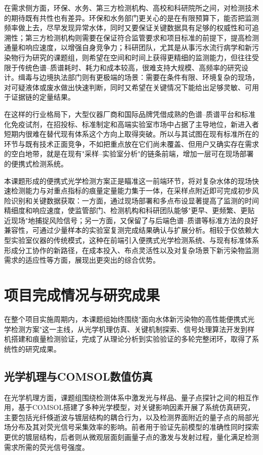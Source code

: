 \documentclass[12pt,a4paper]{article}
\begin{document}
在需求侧方面，环保、水务、第三方检测机构、高校和科研院所之间，对检测技术的期待既有共性也有差异。环保和水务部门更关心的是在有限预算下，能否把监测频率做上去，尽早发现异常水体，同时又要保证关键数据具有足够的权威性和可追溯性；第三方检测机构则需要在保证符合监管要求和项目标准的前提下，提高检测通量和响应速度，以增强自身竞争力；科研团队，尤其是从事污水流行病学和新污染物行为研究的课题组，则希望在空间和时间上获得更精细的监测能力，但往往受限于传统色谱--质谱耗时、耗力和成本较高，很难支持大规模、高频率的研究设计。缉毒与边境执法部门则有更极端的场景：需要在条件有限、环境复杂的现场，对可疑液体或废水做出快速判断，同时又希望在关键情况下能给出足够灵敏、可用于证据链的定量结果。

在这样的行业格局下，大型仪器厂商和国际品牌凭借成熟的色谱--质谱平台和标准化免疫试剂，在招投标、标准制定和高端实验室市场中占据了主导地位，新进入者短期内很难在替代现有体系这个方向上取得突破。所以与其试图在现有标准所在的环节与既有技术正面竞争，不如把重点放在它们尚未覆盖、但用户又确实存在需求的空白地带，就是在现有"采样--实验室分析"的链条前端，增加一层可在现场部署的便携式检测系统。

本课题形成的便携式光学检测方案正是瞄准这一前端环节，将对复杂水体的现场快速检测能力与对重点指标的痕量定量能力集于一体，在采样点附近即可完成初步风险识别和关键数据获取：一方面，通过现场部署和多点布设显著提高了监测的时间精细度和响应速度，使监管部门、检测机构和科研团队能够"更早、更频繁、更贴近现场"地捕捉风险信号；另一方面，又保留了与后端色谱--质谱等标准方法的良好兼容性，可通过少量样本的实验室复测完成结果确认与扩展分析。相较于仅依赖大型实验室仪器的传统模式，这种在前端引入便携式光学检测系统、与现有标准体系形成分工协作的新路径，在成本投入、布点灵活性以及对复杂场景下新污染物监测需求的适应性等方面，展现出更突出的综合优势。

\section{项目完成情况与研究成果}

在整个项目实施周期内，本课题组始终围绕"面向水体新污染物的高性能便携式光学检测方案"这一主线，从光学机理仿真、关键机制探索、信号处理算法开发到样机搭建和痕量检测验证，完成了从理论分析到实验验证的多轮完整闭环，取得了系统性的研究成果。

\subsection{光学机理与COMSOL数值仿真}

在光学机理方面，课题组围绕检测体系中激发光与样品、量子点探针之间的相互作用，基于COMSOL搭建了多种光学模型，对关键影响因素开展了系统仿真研究，主要包括光纤倏逝波与镀层结构的耦合行为，以及检测界面附近的量子点的局部光场分布及其对荧光信号采集效率的影响。前者用于验证先前模型的准确性同时探索更优的镀层结构，后者则从微观层面刻画量子点的激发与发射过程，量化满足检测需求所需的荧光信号强度。
\end{document}
